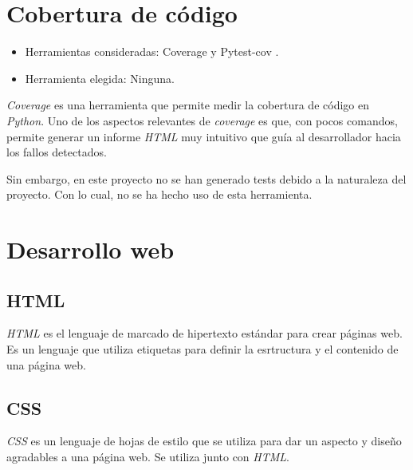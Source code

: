 \section{Cobertura de código}\label{cobertura_codigo}
\begin{itemize}
\tightlist
\item
  Herramientas consideradas: Coverage  \citep{online:coverage} y Pytest-cov \citep{online:pytest_cov}.
\item
  Herramienta elegida: Ninguna.
\end{itemize}

\emph{Coverage} es una herramienta que permite medir la cobertura de código en \emph{Python}. Uno de los aspectos relevantes de \emph{coverage} es que, con pocos comandos, permite generar
un informe \textit{HTML} muy intuitivo que guía al desarrollador hacia los fallos detectados. 

Sin embargo, en este proyecto no se han generado tests debido a la naturaleza del proyecto. Con lo cual, no se ha hecho uso de esta herramienta.



\section{Desarrollo web}\label{desarrollo_web}

\subsection{HTML}\label{html}

\emph{HTML} \citep{wiki:html} es el lenguaje de marcado de hipertexto estándar para crear páginas web. Es un lenguaje que utiliza etiquetas para definir la esrtructura y el contenido de una página web. 

\subsection{CSS}\label{css}

\emph{CSS} \citep{wiki:css} es un lenguaje de hojas de estilo que se utiliza para dar un aspecto y diseño agradables a una página web. Se utiliza junto con \emph{HTML}.

